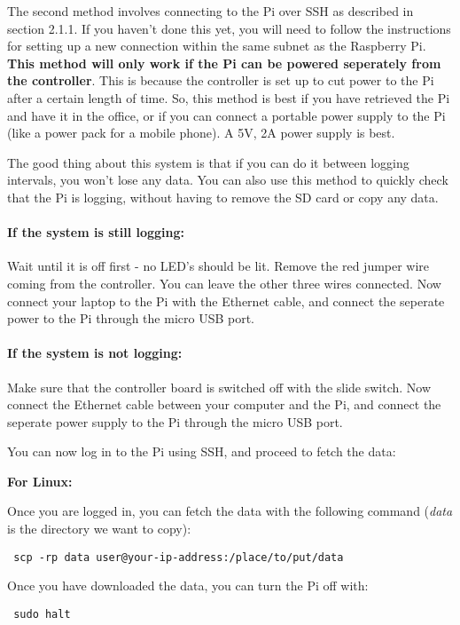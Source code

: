 \documentclass[10pt]{article}
\begin{document}
The second method involves connecting to the Pi over SSH as described in section 2.1.1. If you haven't done this yet, you will need to follow the instructions for setting up a new connection within the same subnet as the Raspberry Pi. \textbf{This method will only work if the Pi can be powered seperately from the controller}. This is because the controller is set up to cut power to the Pi after a certain length of time. So, this method is best if you have retrieved the Pi and have it in the office, or if you can connect a portable power supply to the Pi (like a power pack for a mobile phone). A 5V, 2A power supply is best.

The good thing about this system is that if you can do it between logging intervals, you won't lose any data. You can also use this method to quickly check that the Pi is logging, without having to remove the SD card or copy any data.

\paragraph{If the system is still logging:}
Wait until it is off first - no LED's should be lit. Remove the red jumper wire coming from the controller. You can leave the other three wires connected. Now connect your laptop to the Pi with the Ethernet cable, and connect the seperate power to the Pi through the micro USB port.

\paragraph{If the system is not logging:}
Make sure that the controller board is switched off with the slide switch. Now connect the Ethernet cable between your computer and the Pi, and connect the seperate power supply to the Pi through the micro USB port. \newline

You can now log in to the Pi using SSH, and proceed to fetch the data:

\textbf{For Linux:} \newline

Once you are logged in, you can fetch the data with the following command (\textit{data} is the directory we want to copy):

\begin{verbatim}
 scp -rp data user@your-ip-address:/place/to/put/data
\end{verbatim}

Once you have downloaded the data, you can turn the Pi off with:
\begin{verbatim}
 sudo halt
\end{verbatim}
\end{document}
